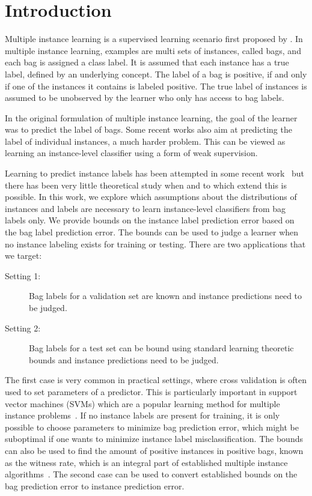 \section{Introduction}
Multiple instance learning is a supervised learning scenario first proposed by \citet{dietterich1997solving}.
In multiple instance learning, examples are multi sets of instances, called bags, and each bag is assigned a class label.
It is assumed that each instance has a true label, defined by an underlying concept. The label of a bag is positive, if and only if one of
the instances it contains is labeled positive. The true label of instances is assumed to be unobserved by the learner who only has access to bag labels.

In the original formulation of multiple instance learning, the goal of the learner
was to predict the label of bags. Some recent works also aim at predicting
the label of individual instances, a much harder problem.
This can be viewed as learning an instance-level classifier using a form of weak supervision.

Learning to predict instance labels has been attempted in some recent work~\citep{liconvex2010,zhang2002dd}
but there has been very little theoretical study when and to which extend this is possible.
In this work, we explore which assumptions about the distributions of instances and labels
are necessary to learn instance-level classifiers from bag labels only.
We provide bounds on the instance label prediction error based on the
bag label prediction error. The bounds can be used to judge a learner when no
instance labeling exists for training or testing.
There are two applications that we target:
\begin{description}
\item[Setting 1:] Bag labels for a validation set are known and instance predictions need to be judged.
\item[Setting 2:] Bag labels for a test set can be bound using standard learning theoretic bounds and instance
predictions need to be judged.
\end{description}
The first case is very common in practical settings, where
cross validation is often used to set parameters of a predictor. This is
particularly important in support vector machines (SVMs) which are a popular
learning method for multiple instance problems~\citep{andrews2003support}.
If no instance labels are present for training, it is only possible to
choose parameters to minimize bag prediction error, which might be suboptimal if one
wants to minimize instance label misclassification. 
The bounds can also be used to find the amount of positive instances in positive bags,
known as the witness rate, which is an integral part of established multiple
instance algorithms~\citep{zhang2002dd,liconvex2010}.
The second case can be used to convert established bounds on the bag prediction error
to instance prediction error.

